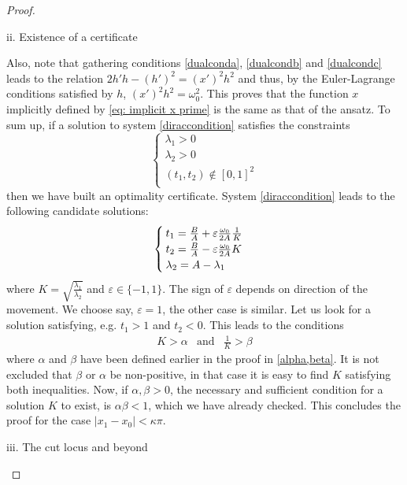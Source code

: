 \begin{proof}
\begin{paragraph}{ii. Existence of a certificate}
%

Also, note that gathering conditions \eqref{dualconda},  \eqref{dualcondb} and \eqref{dualcondc} leads to the relation $2h'h-(h')^2 = (x')^2h^2$ and thus, by the Euler-Lagrange conditions satisfied by $h$, $(x')^2h^2 = \omega_0^2$. This proves that the function $x$ implicitly defined by \eqref{eq: implicit x prime} is the same as that of the ansatz.
To sum up, if a solution to system \eqref{diraccondition} satisfies the constraints
\[
\begin{cases}
\lambda_1> 0\\
\lambda_2 > 0\\
(t_1,t_2) \notin [0,1]^2\\
\end{cases}
\]
then we have built an optimality certificate. System \eqref{diraccondition} leads to the following candidate solutions:
\[
\begin{cases}
t_1 = \frac{B}{A} +\varepsilon \frac{\omega_0}{2A} \frac{1}{ K} \\
t_2 = \frac{B}{A} -\varepsilon \frac{\omega_0}{2A} K\\
\lambda_2=A-\lambda_1
\end{cases}
\]
where $K=\sqrt{\frac{\lambda_1}{\lambda_2}}$ and $\varepsilon \in \{-1,1\}$. The sign of $\varepsilon$ depends on direction of the movement. We choose say, $\varepsilon=1$, the other case is similar. Let us look for a solution satisfying, e.g. $t_1>1$ and $t_2<0$. This leads to the conditions
\begin{eqnarray*}
K > \alpha 
& 
\text{and} & 
\frac{1}{K} > \beta
\end{eqnarray*}
where $\alpha$ and $\beta$ have been defined earlier in the proof in \eqref{alpha,beta}. It is not excluded that $\beta$ or $\alpha$ be non-positive, in that case it is easy to find $K$ satisfying both inequalities. Now, if $\alpha, \beta >0$, the necessary and sufficient condition for a solution $K$ to exist, is $\alpha \beta <1$, which we have already checked. This concludes the proof for the case $\vert x_1-x_0 \vert < \kappa \pi$.
\end{paragraph}
\item
\begin{paragraph}{iii. The cut locus and beyond}

\end{paragraph}
\end{proof}
